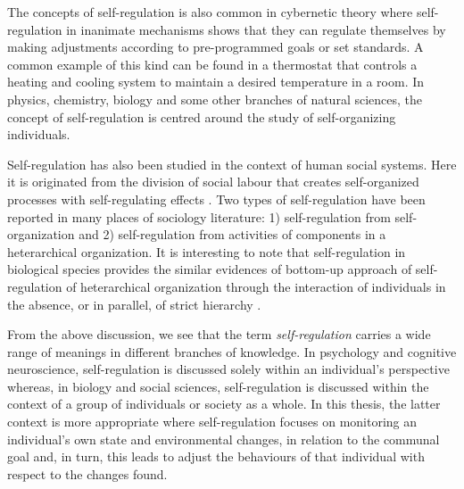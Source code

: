 The concepts of self-regulation is also common in cybernetic theory where self-regulation in inanimate mechanisms shows that they can regulate themselves by making adjustments according to pre-programmed goals or set standards. A common example of this kind can be found in a thermostat that controls a heating and cooling system to maintain a desired temperature in a room. In physics, chemistry, biology and some other branches of natural sciences, the concept of self-regulation is centred around the study of self-organizing individuals. 

Self-regulation has also been studied in the context of human social systems. Here it is originated from the division of social labour that creates self-organized processes with self-regulating effects \cite{Kppers+1990}. Two types of self-regulation have been reported in many places of sociology literature: 1) self-regulation from self-organization and 2) self-regulation from activities of components in a heterarchical organization. It is interesting to note that self-regulation in biological species provides the similar evidences of bottom-up approach of self-regulation of heterarchical organization through the interaction of individuals in the absence, or in parallel, of strict hierarchy \cite{Beer1981}.

From the above discussion, we see that the term {\em self-regulation} carries a wide range of meanings in different branches of knowledge. In psychology and cognitive neuroscience, self-regulation is discussed solely within an individual's perspective whereas, in biology and social sciences, self-regulation is discussed within the context of a group of individuals or society as a whole. In  this thesis, the latter context is more appropriate where  self-regulation focuses on monitoring an individual's own state and environmental changes, in relation to the communal goal and, in turn, this leads to adjust the behaviours of that individual with respect to the changes found.

